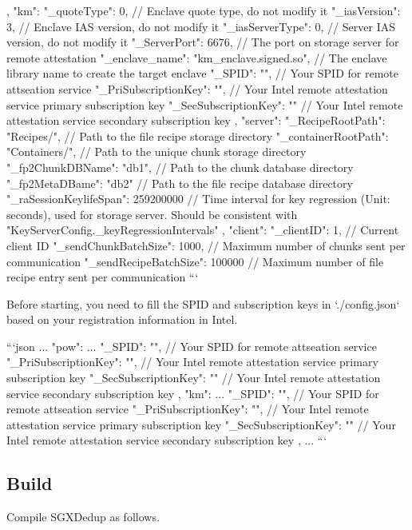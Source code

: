 {{    },
    "km": {
        "\_quoteType": 0, // Enclave quote type, do not modify it 
        "\_iasVersion": 3, // Enclave IAS version, do not modify it 
        "\_iasServerType": 0, // Server IAS version, do not modify it
        "\_ServerPort": 6676, // The port on storage server for remote attestation
        "\_enclave\_name": "km\_enclave.signed.so", // The enclave library name to create the target enclave
        "\_SPID": "", // Your SPID for remote attseation service
        "\_PriSubscriptionKey": "", // Your Intel remote attestation service primary subscription key
        "\_SecSubscriptionKey": "" // Your Intel remote attestation service secondary subscription key
    },
    "server": {
        "\_RecipeRootPath": "Recipes/", // Path to the file recipe storage directory
        "\_containerRootPath": "Containers/", // Path to the unique chunk storage directory
        "\_fp2ChunkDBName": "db1", // Path to the chunk database directory
        "\_fp2MetaDBame": "db2" // Path to the file recipe database directory
        "\_raSessionKeylifeSpan": 259200000 // Time interval for key regression (Unit: seconds), used for storage server. Should be consistent with "KeyServerConfig.\_keyRegressionIntervals"
    },
    "client": {
        "\_clientID": 1, // Current client ID 
        "\_sendChunkBatchSize": 1000, // Maximum number of chunks sent per communication
        "\_sendRecipeBatchSize": 100000 // Maximum number of file recipe entry sent per communication
    }
}
```

Before starting, you need to fill the SPID and subscription keys in `./config.json` based on your registration information in Intel.

```json
...
"pow": {
    ...
    "\_SPID": "", // Your SPID for remote attseation service
    "\_PriSubscriptionKey": "", // Your Intel remote attestation service primary subscription key
    "\_SecSubscriptionKey": "" // Your Intel remote attestation service secondary subscription key
},
"km": {
    ...
    "\_SPID": "", // Your SPID for remote attseation service
    "\_PriSubscriptionKey": "", // Your Intel remote attestation service primary subscription key
    "\_SecSubscriptionKey": "" // Your Intel remote attestation service secondary subscription key
},
...
```

\subsection{Build}

Compile SGXDedup as follows.

